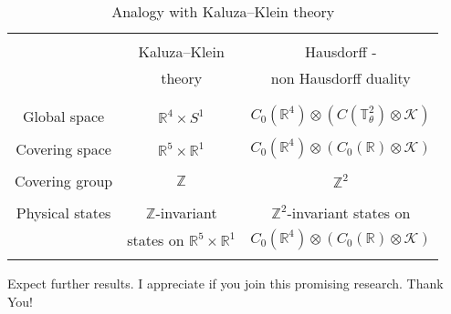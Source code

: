 \documentclass{beamer}
\theoremstyle{plain}
\begin{document}
\begin{frame}
	\break
	\begin {table}[H]
	\caption {Analogy with Kaluza–Klein theory} \label{s_mappingkk_table} 
	\begin{center}
		\begin{tabular}{|c|c|c|}
			\hline
	&		&\\
	&		Kaluza–Klein   & Hausdorff - \\
	&		theory   &  non Hausdorff duality\\
	&		&\\
			\hline
	&		&\\
Global space		&	$\mathbb R^4 \times S^1$ & $C_0\left(\mathbb R^4 \right) \otimes \left( C\left( \mathbb T^2_\theta \right) \otimes \mathcal K\right)$   \\
	&		&\\
Covering space		&	$\mathbb R^5 \times \mathbb R^1$ & $C_0\left(\mathbb R^4 \right) \otimes\left(  C_0\left(\mathbb R \right)  \otimes \mathcal K\right)$   \\
&		&\\
Covering group		&	$ \mathbb Z$ & $ \mathbb Z^2$   \\
&		&\\
		Physical states		& $\mathbb Z$-invariant 	 & $\mathbb Z^2$-invariant  states on \\
		&  states on $\mathbb R^5 \times \mathbb R^1$ & $C_0\left(\mathbb R^4 \right) \otimes\left(  C_0\left(\mathbb R \right)  \otimes \mathcal K\right)$\\
			&		&\\
			\hline
			
		\end{tabular}
	\end{center}
	\end {table}
	
\end{frame}


\begin{frame}
	\begin{center}
		\Huge
		Expect further results.
		\newline
		I appreciate if you join this promising research.
		\newline
		\alert{Thank You!}
	\end{center}
\end{frame}
\end{document}
